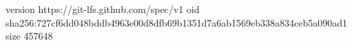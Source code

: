 version https://git-lfs.github.com/spec/v1
oid sha256:727cf6dd048bddb4963e00d8dfb69b1351d7a6ab1569eb338a834ceb5a090ad1
size 457648
